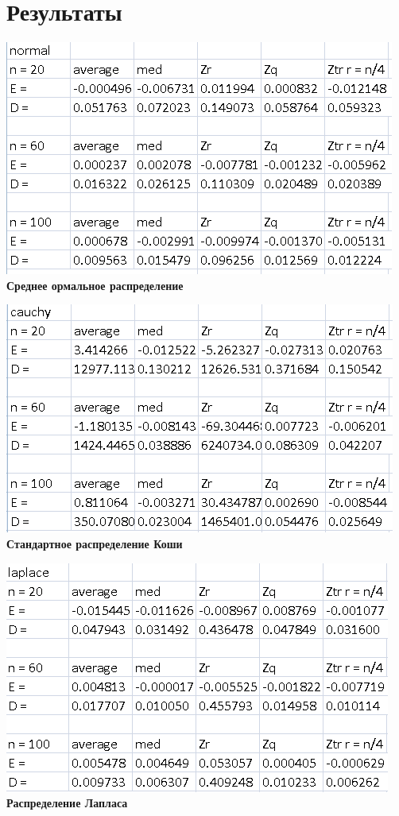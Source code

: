 \documentclass[a4]{article}
\begin{document}
\section{Результаты}
\begin{center}

\includegraphics[width=\textwidth]{normal.png}
\textbf{Среднее ормальное распределение}

\includegraphics[width=\textwidth]{cauchy.png} \textbf{Стандартное распределение Коши}

\includegraphics[width=\textwidth]{laplace.png} \textbf{Распределение Лапласа}


\end{center}
\end{document}
